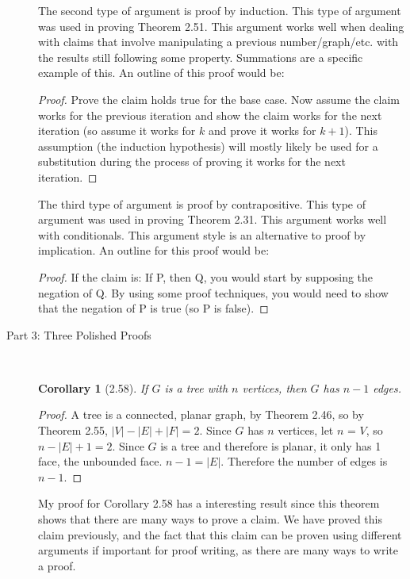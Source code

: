 \documentclass{article}
\newtheorem*{cor}{Corollary}
\begin{document}
\begin{description}
	The second type of argument is proof by induction. This type of argument was used in proving Theorem 2.51. This argument works well when dealing
	with claims that involve manipulating a previous number/graph/etc. with the results still following some property. Summations are a specific
	example of this. An outline of this proof would be: \\
	\begin{proof} Prove the claim holds true for the base case. Now assume the claim works for the previous iteration and show the claim works
	  for the next iteration (so assume it works for $k$ and prove it works for $k + 1$). This assumption (the induction hypothesis) will
	mostly likely be used for a substitution during the process of proving it works for the next iteration. \end{proof}

	The third type of argument is proof by contrapositive. This type of argument was used in proving Theorem 2.31. This argument works well
	with conditionals. This argument style is an alternative to proof by implication. An outline for this proof would be: \\
	\begin{proof} If the claim is: If P, then Q, you would start by supposing the negation of Q. By using some proof techniques, you would need
	  to show that the negation of P is true (so P is false). 
	\end{proof}

	\item[Part 3: Three Polished Proofs] \hfil \\


	 	 \begin{cor}[2.58]
	    	If $G$ is a tree with $n$ vertices, then $G$ has $n - 1$ edges.
		      \end{cor}
		\begin{proof}
			A tree is a connected, planar graph, by Theorem 2.46, so by Theorem 2.55, $|V| - |E| + |F| = 2$. Since $G$ has $n$ vertices, 
			let $n$ = $V$, so
			$n - |E| + 1 = 2$. Since $G$ is a tree and therefore is planar, it only has 1 face, the unbounded face. $n - 1 = |E|$. Therefore the number of edges is $n - 1$.
		\end{proof}
		
		My proof for Corollary 2.58 has a interesting result since this theorem shows that there are many ways to prove a claim. We have proved this claim previously, and
		the fact that this claim can be proven using different arguments if important for proof writing, as there are many ways to 
		write a proof. 
	

\end{description}
\end{document}
